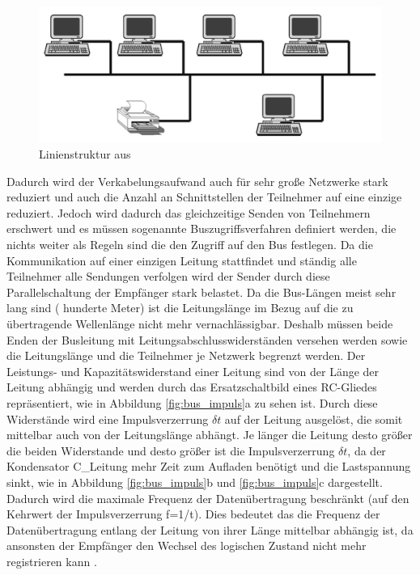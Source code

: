 \begin{figure}
\centering
\includegraphics[width=\textwidth]{abbildungen/20160109_busstruktur}
\caption[Linienstruktur]{Linienstruktur aus \cite[S.~3]{schn06}}
\label{fig:bus_struktur}
\end{figure}

Dadurch wird der Verkabelungsaufwand auch für sehr große Netzwerke stark reduziert und auch die Anzahl an Schnittstellen der Teilnehmer auf eine einzige reduziert. Jedoch wird dadurch das gleichzeitige Senden von Teilnehmern erschwert und es müssen sogenannte Buszugriffsverfahren definiert werden, die nichts weiter als Regeln sind die den Zugriff auf den Bus festlegen. Da die Kommunikation auf einer einzigen Leitung stattfindet und ständig alle Teilnehmer alle Sendungen verfolgen wird der Sender durch diese Parallelschaltung der Empfänger stark belastet. Da die Bus-Längen meist sehr lang sind ( hunderte Meter) ist die Leitungslänge im Bezug auf die zu übertragende Wellenlänge nicht mehr vernachlässigbar. Deshalb müssen beide Enden der Busleitung mit Leitungsabschlusswiderständen versehen werden sowie die Leitungslänge und die Teilnehmer je Netzwerk begrenzt werden. Der Leistungs- und Kapazitätswiderstand einer Leitung sind von der Länge der Leitung abhängig und werden durch das Ersatzschaltbild eines RC-Gliedes repräsentiert, wie in Abbildung \ref{fig:bus_impuls}a zu sehen ist. Durch diese Widerstände wird eine Impulsverzerrung $\delta t$ auf der Leitung ausgelöst, die somit mittelbar auch von der Leitungslänge abhängt. Je länger die Leitung desto größer die beiden Widerstande und desto größer ist die Impulsverzerrung $\delta t$, da der Kondensator C\_{Leitung} mehr Zeit zum Aufladen benötigt und die Lastspannung sinkt, wie in Abbildung \ref{fig:bus_impuls}b und \ref{fig:bus_impuls}c dargestellt. Dadurch wird die maximale Frequenz der Datenübertragung beschränkt (auf den Kehrwert der Impulsverzerrung f=1/t). Dies bedeutet das die Frequenz der Datenübertragung entlang der Leitung von ihrer Länge mittelbar abhängig ist, da ansonsten der Empfänger den Wechsel des logischen Zustand nicht mehr registrieren kann \cite[S.~3ff.]{schn06}.

